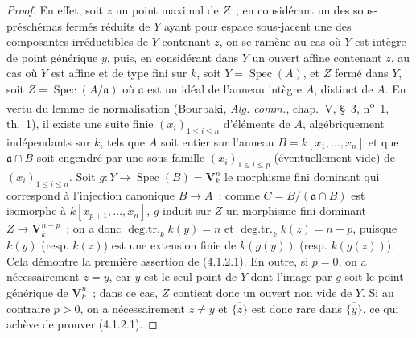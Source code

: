 \begin{proof}
En effet, soit $z$ un point maximal de $Z$~; en considérant un des
sous-préschémas fermés réduits de $Y$ ayant pour espace sous-jacent une des
composantes irréductibles de $Y$ contenant $z$, on se ramène au cas où $Y$ est
intègre de point générique $y$, puis, en considérant dans $Y$ un ouvert affine
contenant $z$, au cas où $Y$ est affine et de type fini sur $k$, soit
$Y=\operatorname{Spec}(A)$, et $Z$ fermé dans $Y$, soit
$Z=\operatorname{Spec}(A/\mathfrak a)$ où $\mathfrak a$ est un idéal de
l'anneau intègre $A$, distinct de $A$. En vertu du lemme de normalisation
(Bourbaki, \emph{Alg. comm.}, chap.~V, \S~3,
n\textsuperscript{o}~1, th.~1), il existe une suite finie
$(x_i)_{1\leqslant i\leqslant n}$ d'éléments de $A$, algébriquement
indépendants sur $k$, tels que $A$ soit entier sur l'anneau
$B=k[x_1,\ldots,x_n]$ et que $\mathfrak a\cap B$ soit engendré par une
sous-famille $(x_i)_{1\leqslant i\leqslant p}$ (éventuellement vide) de
$(x_i)_{1\leqslant i\leqslant n}$. Soit
$g:Y\to\operatorname{Spec}(B)=\mathbf V_k^n$ le morphisme fini dominant qui
correspond à l'injection canonique $B\to A$~; comme
$C=B/(\mathfrak a\cap B)$ est isomorphe à $k[x_{p+1},\ldots,x_n]$, $g$ induit
sur $Z$ un morphisme fini dominant $Z\to\mathbf V_k^{n-p}$~; on a donc
$\operatorname{deg.tr.}_k k(y)=n$ et
$\operatorname{deg.tr.}_k k(z)=n-p$, puisque $k(y)$ (resp. $k(z)$) est une
extension finie de $k(g(y))$ (resp. $k(g(z))$). Cela démontre la première
assertion de (4.1.2.1). En outre, si $p=0$, on a nécessairement $z=y$, car $y$
est le seul point de $Y$ dont l'image par $g$ soit le point générique de
$\mathbf V_k^n$~; dans ce cas, $Z$ contient donc un ouvert non vide de $Y$. Si
au contraire $p>0$, on a nécessairement $z\neq y$ et
$\overline{\{z\}}$ est donc rare dans $\overline{\{y\}}$, ce qui achève de
prouver (4.1.2.1).
\end{proof}

